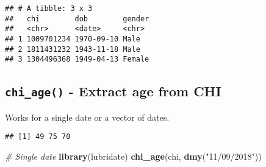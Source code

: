 \documentclass[]{book}
\newenvironment{Shaded}{\begin{snugshade}}{\end{snugshade}}
\newcommand{\CommentTok}[1]{\textcolor[rgb]{0.56,0.35,0.01}{\textit{#1}}}
\newcommand{\ControlFlowTok}[1]{\textcolor[rgb]{0.13,0.29,0.53}{\textbf{#1}}}
\newcommand{\DataTypeTok}[1]{\textcolor[rgb]{0.13,0.29,0.53}{#1}}
\newcommand{\DecValTok}[1]{\textcolor[rgb]{0.00,0.00,0.81}{#1}}
\newcommand{\KeywordTok}[1]{\textcolor[rgb]{0.13,0.29,0.53}{\textbf{#1}}}
\newcommand{\NormalTok}[1]{#1}
\newcommand{\OperatorTok}[1]{\textcolor[rgb]{0.81,0.36,0.00}{\textbf{#1}}}
\newcommand{\StringTok}[1]{\textcolor[rgb]{0.31,0.60,0.02}{#1}}
\begin{document}
\begin{Shaded}
\end{Shaded}

\begin{verbatim}
## # A tibble: 3 x 3
##   chi        dob        gender
##   <chr>      <date>     <chr> 
## 1 1009701234 1970-09-10 Male  
## 2 1811431232 1943-11-18 Male  
## 3 1304496368 1949-04-13 Female
\end{verbatim}

\hypertarget{chi_age---extract-age-from-chi}{%
\subsection{\texorpdfstring{\texttt{chi\_age()} - Extract age from CHI}{chi\_age() - Extract age from CHI}}\label{chi_age---extract-age-from-chi}}

Works for a single date or a vector of dates.

\begin{Shaded}
\end{Shaded}

\begin{verbatim}
## [1] 49 75 70
\end{verbatim}

\begin{Shaded}
\begin{Highlighting}[]
\CommentTok{# Single date}
\KeywordTok{library}\NormalTok{(lubridate)}
\KeywordTok{chi_age}\NormalTok{(chi, }\KeywordTok{dmy}\NormalTok{(}\StringTok{"11/09/2018"}\NormalTok{))}
\end{Highlighting}
\end{Shaded}
\end{document}
